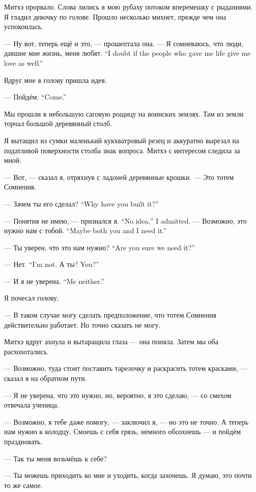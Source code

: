 Митхэ прорвало.
Слова лились в мою рубаху потоком вперемешку с рыданиями.
Я гладил девочку по голове.
Прошло несколько михнет, прежде чем она успокоилась.

--- Ну вот, теперь ещё и это, --- прошептала она.
{--- Я сомневаюсь, что люди, давшие мне жизнь, меня любят.}
{``I doubt if the people who gave me life give me love as well.''}

Вдруг мне в голову пришла идея.

{--- Пойдём.}
{``Come.''}

Мы прошли в небольшую саговую рощицу на воинских землях.
Там из земли торчал большой деревянный столб.

Я вытащил из сумки маленький кукхватровый резец и аккуратно вырезал на податливой поверхности столба знак вопроса.
Митхэ с интересом следила за мной.

--- Вот, --- сказал я, отряхнув с ладоней деревянные крошки.
--- Это тотем Сомнения.

{--- Зачем ты его сделал?}
{``Why have you built it?''}

{--- Понятия не имею, --- признался я.}
{``No idea,'' I admitted.}
{--- Возможно, это нужно нам с тобой.}
{``Maybe both you and I need it.''}

{--- Ты уверен, что это нам нужно?}
{``Are you sure we need it?''}

{--- Нет.}
{``I'm not.}
{А ты?}
{You?''}

{--- И я не уверена.}
{``Me neither.''}

Я почесал голову.

--- В таком случае могу сделать предположение, что тотем Сомнения действительно работает.
Но точно сказать не могу.

Митхэ вдруг ахнула и вытаращила глаза --- она поняла.
Затем мы оба расхохотались.

--- Возможно, туда стоит поставить тарелочку и раскрасить тотем красками, --- сказал я на обратном пути.

--- Я не уверена, что это нужно, но, вероятно, я это сделаю, --- со смехом отвечала ученица.

--- Возможно, я тебе даже помогу, --- заключил я, --- но это не точно.
А теперь нам нужно к колодцу.
Смоешь с себя грязь, немного обсохнешь --- и пойдём праздновать.

--- Так ты меня возьмёшь к себе?

--- Ты можешь приходить ко мне и уходить, когда захочешь.
Я думаю, это почти то же самое.


